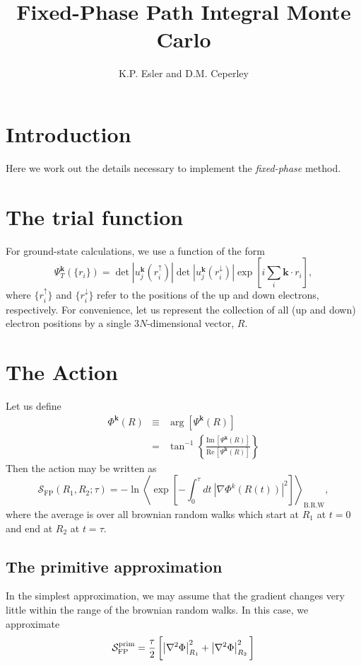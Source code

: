 \documentclass{article}
\title{Fixed-Phase Path Integral Monte Carlo}
\author{K.P. Esler and D.M. Ceperley}
\begin{document}
\maketitle
\section{Introduction}
Here we work out the details necessary to implement the {\em fixed-phase} method\cite{Ortiz93}.
\section{The trial function}
For ground-state calculations, we use a function of the form
\begin{equation}
\Psi^\mathbf{k}_T(\{r_i\}) = 
\det |u^\mathbf{k}_j(r^\uparrow_i)| 
\det |u^\mathbf{k}_j(r^\downarrow_i)| 
\exp\left[i\sum_i \mathbf{k} \cdot r_i \right],
\end{equation}
where $\{r^\uparrow_i\}$ and $\{r^\downarrow_i\}$ refer to the
positions of the up and down electrons, respectively.  For
convenience, let us represent the collection of all (up and down)
electron positions by a single $3N$-dimensional vector, $R$.

\section{The Action}
Let us define
\renewcommand{\Im}{\mathrm{Im}\,}
\renewcommand{\Re}{\mathrm{Re}\,}
\begin{eqnarray}
\Phi^\mathbf{k}(R) & \equiv &\arg\left[\Psi^\mathbf{k}(R)\right] \\
& = & \tan^{-1} \left\{ \frac{\Im \left[\Psi^\mathbf{k}(R)\right]}{\Re \left[\Psi^{\mathbf{k}}(R)\right]}
\right\}
\end{eqnarray}
Then the action may be written as
\begin{equation}
\mathcal{S}_{\text{FP}}(R_1,R_2;\tau) = 
-\ln \left\langle
\exp\left[-\int_0^\tau dt\ |\nabla \Phi^{k}(R(t))|^2 \right]
\right\rangle_\text{B.R.W},
\end{equation}
where the average is over all brownian random walks which start at
$R_1$ at $t=0$ and end at $R_2$ at $t=\tau$.

\subsection{The primitive approximation}
In the simplest approximation, we may assume that the gradient changes
very little within the range of the brownian random walks.  In this
case, we approximate
\begin{equation}
\mathcal{S}_\text{FP}^\text{prim} = \frac{\tau}{2} 
\left[ \left|\nabla^2 \Phi\right|_{R_1}^2 + \left|\nabla^2 \Phi\right|_{R_2}^2 
\rule{0cm}{0.5cm}\right]
\end{equation}
\end{document}
